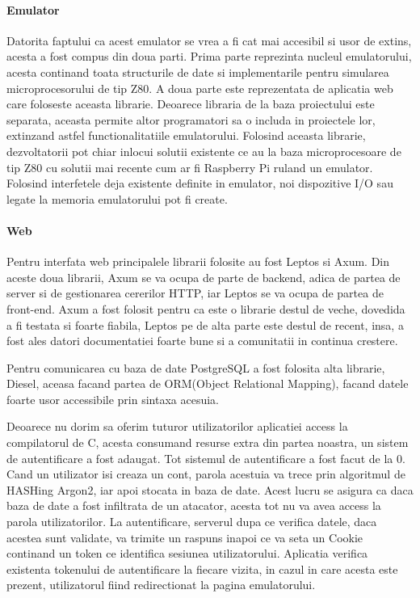 \documentclass[titlepage,12pt]{article}
\DeclareRobustCommand{\code}[1]{{\ttfamily\small #1}}
\begin{document}
\paragraph{Emulator}
Datorita faptului ca acest emulator se vrea a fi cat mai accesibil si usor de extins, acesta a fost compus din doua parti. Prima parte reprezinta nucleul emulatorului, acesta continand toata structurile de date si implementarile pentru simularea microprocesorului de tip Z80.
A doua parte este reprezentata de aplicatia web care foloseste aceasta librarie.
Deoarece libraria de la baza proiectului este separata, aceasta permite altor programatori sa o includa in proiectele lor, extinzand astfel functionalitatiile emulatorului. Folosind aceasta librarie, dezvoltatorii pot chiar inlocui solutii existente ce au la baza microprocesoare de tip Z80 cu solutii mai recente cum ar fi Raspberry Pi ruland un emulator. Folosind interfetele deja existente definite in emulator, noi dispozitive I/O sau legate la memoria emulatorului pot fi create.

\paragraph{Web}
Pentru interfata web principalele librarii folosite au fost \code{Leptos} si \code{Axum}. Din aceste doua librarii, \code{Axum} se va ocupa de parte de backend, adica de partea de server si de gestionarea cererilor HTTP, iar \code{Leptos} se va ocupa de partea de front-end. Axum a fost folosit pentru ca este o librarie destul de veche, dovedida a fi testata si foarte fiabila, Leptos pe de alta parte este destul de recent, insa, a fost ales datori documentatiei foarte bune si a comunitatii in continua crestere.

Pentru comunicarea cu baza de date \code{PostgreSQL} a fost folosita alta librarie, \code{Diesel}, aceasa facand partea de ORM(Object Relational Mapping), facand datele foarte usor accessibile prin sintaxa acesuia.

Deoarece nu dorim sa oferim tuturor utilizatorilor aplicatiei access la compilatorul de C, acesta consumand resurse extra din partea noastra, un sistem de autentificare a fost adaugat.
Tot sistemul de autentificare a fost facut de la 0. Cand un utilizator isi creaza un cont, parola acestuia va trece prin algoritmul de HASHing \code{Argon2}, iar apoi stocata in baza de date. Acest lucru se asigura ca daca baza de date a fost infiltrata de un atacator, acesta tot nu va avea access la parola utilizatorilor.
La autentificare, serverul dupa ce verifica datele, daca acestea sunt validate, va trimite un raspuns inapoi ce va seta un \code{Cookie} continand un \code{token} ce identifica sesiunea utilizatorului.
Aplicatia verifica existenta tokenului de autentificare la fiecare vizita, in cazul in care acesta este prezent, utilizatorul fiind redirectionat la pagina emulatorului.
\end{document}
